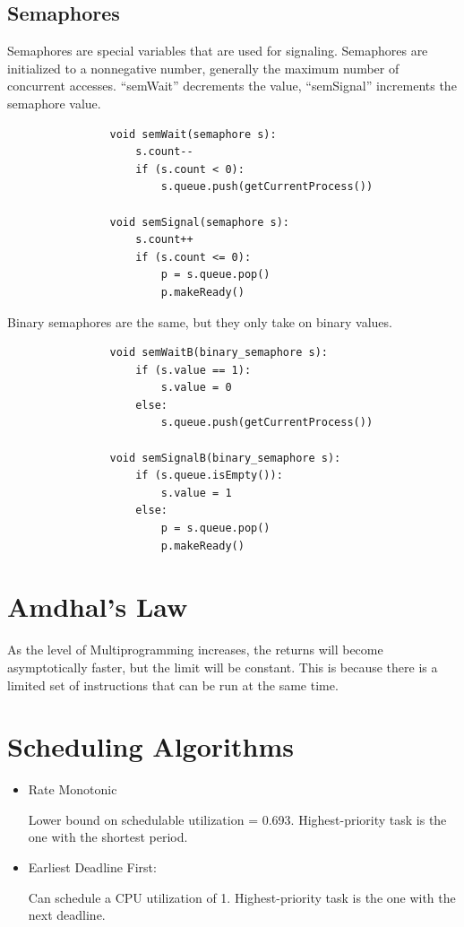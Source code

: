         \subsection{Semaphores} %
        \label{subsec:semaphores}
            Semaphores are special variables that are used for signaling.
            Semaphores are initialized to a nonnegative number, generally the
            maximum number of concurrent accesses.
            ``semWait'' decrements the value, ``semSignal'' increments the
            semaphore value.
            \begin{verbatim}
                void semWait(semaphore s):
                    s.count--
                    if (s.count < 0):
                        s.queue.push(getCurrentProcess())

                void semSignal(semaphore s):
                    s.count++
                    if (s.count <= 0):
                        p = s.queue.pop()
                        p.makeReady()
            \end{verbatim}
            Binary semaphores are the same, but they only take on binary values.
            \begin{verbatim}
                void semWaitB(binary_semaphore s):
                    if (s.value == 1):
                        s.value = 0
                    else:
                        s.queue.push(getCurrentProcess())

                void semSignalB(binary_semaphore s):
                    if (s.queue.isEmpty()):
                        s.value = 1
                    else:
                        p = s.queue.pop()
                        p.makeReady()
            \end{verbatim}

    \section{Amdhal's Law} %
    \label{sec:amdhal_s_law}
    As the level of Multiprogramming increases, the returns will become
    asymptotically faster, but the limit will be constant. This is because there
    is a limited set of instructions that can be run at the same time.

    \section{Scheduling Algorithms} %
    \label{sec:scheduling_algorithms}
    \begin{itemize}
        \item Rate Monotonic

            Lower bound on schedulable utilization = 0.693.
            Highest-priority task is the one with the shortest period.

        \item Earliest Deadline First:

            Can schedule a CPU utilization of 1.
            Highest-priority task is the one with the next deadline.
    \end{itemize}

